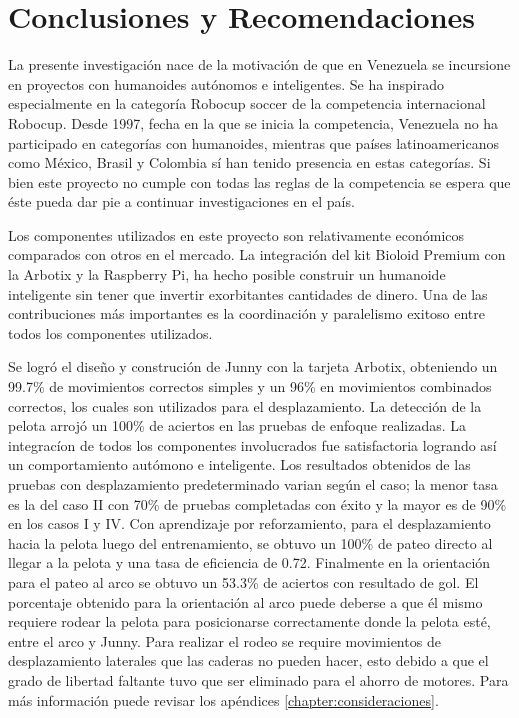 \chapter{Conclusiones y Recomendaciones} \label{chapter:conclusiones}

\label{chap:conclusiones}

La presente investigación nace de la motivación de que en Venezuela se incursione en proyectos con humanoides autónomos e inteligentes. Se ha inspirado especialmente en la categoría Robocup soccer de la competencia internacional Robocup. Desde 1997, fecha en la que se inicia la competencia, Venezuela no ha participado en categorías con humanoides, mientras que países latinoamericanos como México, Brasil y Colombia sí han tenido presencia en estas categor\'ias. Si bien este proyecto no cumple con todas las reglas de la competencia se espera que éste pueda dar pie a continuar investigaciones en el pa\'is.

Los componentes utilizados en este proyecto son relativamente económicos comparados con otros en el mercado. La integración del kit Bioloid Premium con la Arbotix y la Raspberry Pi, ha hecho posible construir un humanoide inteligente sin tener que invertir exorbitantes cantidades de dinero. Una de las contribuciones más importantes es la coordinación y paralelismo exitoso entre todos los componentes utilizados.

Se logr\'o el dise\~no y construci\'on de Junny con la tarjeta Arbotix, obteniendo un 99.7\% de movimientos correctos simples y un 96\% en movimientos combinados correctos, los cuales son utilizados para el desplazamiento. La detecci\'on de la pelota arroj\'o un 100\% de aciertos en las pruebas de enfoque realizadas. La integrac\'ion de todos los componentes involucrados fue satisfactoria logrando as\'i un comportamiento aut\'omono e inteligente. Los resultados obtenidos de las pruebas con desplazamiento predeterminado varian seg\'un el caso; la menor tasa es la del caso II con 70\% de pruebas completadas con éxito y la mayor es de 90\% en los casos I y IV. Con aprendizaje por reforzamiento, para el desplazamiento hacia la pelota luego del entrenamiento, se obtuvo un 100\% de pateo directo al llegar a la pelota y una tasa de eficiencia de 0.72. Finalmente en la orientaci\'on para el pateo al arco se obtuvo un 53.3\% de aciertos con resultado de gol. 
El porcentaje obtenido para la orientaci\'on al arco puede deberse a que \'el mismo requiere rodear la pelota para posicionarse correctamente donde la pelota est\'e, entre el arco y Junny. Para realizar el rodeo se require movimientos de desplazamiento laterales que las caderas no pueden hacer, esto debido a que el grado de libertad faltante tuvo que ser eliminado para el ahorro de motores. Para m\'as informaci\'on puede revisar los ap\'endices \ref{chapter:consideraciones}. 

